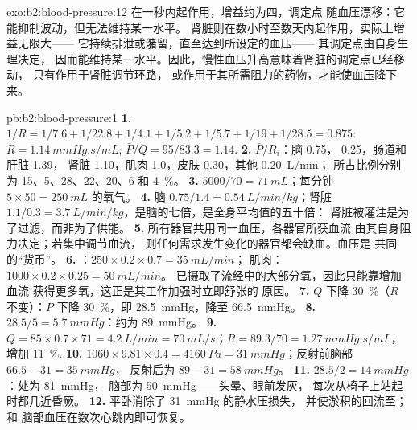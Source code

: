 \begin{solution}{exo:b2:blood-pressure:12}
在一秒内起作用，增益约为四，调定点
随血压漂移：它能抑制波动，但无法维持某一水平。
肾脏则在数小时至数天内起作用，实际上增益无限大——
它持续排泄或潴留，直至达到所设定的血压——
其调定点由自身生理决定，
因而能维持某一水平。因此，慢性血压升高意味着肾脏的调定点已经移动，
只有作用于肾脏调节环路，
或作用于其所需阻力的药物，才能使血压降下来。
\end{solution}

\begin{solution}{pb:b2:blood-pressure:1}
\textbf{1.} $1/R = 1/7.6 + 1/22.8 + 1/4.1 + 1/5.2 + 1/5.7 + 1/19 +
1/28.5 = 0.875$: $R = \qty{1.14}{mmHg.s/mL}$; $\bar P/Q = 95/83.3 =
1.14$.
\textbf{2.} $\bar P/R_i$：脑 0.75， 0.25，肠道和肝脏 1.39，
肾脏 1.10，肌肉 1.0，皮肤 0.30，其他 \qty{0.20}{L/min}；
所占比例分别为 15、5、28、22、20、6 和 \qty{4}{\%}。
\textbf{3.} $5000/70 = \qty{71}{mL}$；每分钟
$5\times 50 = \qty{250}{mL}$ 的氧气。
\textbf{4.} 脑 $0.75/1.4 = \qty{0.54}{L/min/kg}$；肾脏 $1.1/0.3
= \qty{3.7}{L/min/kg}$，是脑的七倍，是全身平均值的五十倍：
肾脏被灌注是为了过滤，而非为了供能。
\textbf{5.} 所有器官共用同一血压，各器官所获血流
由其自身阻力决定；若集中调节血流，
则任何需求发生变化的器官都会缺血。血压是
共同的“货币”。
\textbf{6.} ：$250\times 0.2\times 0.7 = \qty{35}{mL/min}$；
肌肉：$1000\times 0.2\times 0.25 = \qty{50}{mL/min}$。
已摄取了流经中的大部分氧，因此只能靠增加血流
获得更多氧，这正是其工作加强时立即舒张的
原因。
\textbf{7.} $Q$ 下降 \qty{30}{\%}（$R$ 不变）：$\bar P$ 下降
\qty{30}{\%}，即 \qty{28.5}{mmHg}，降至 \qty{66.5}{mmHg}。
\textbf{8.} $28.5/5 = \qty{5.7}{mmHg}$：约为 \qty{89}{mmHg}。
\textbf{9.} $Q = 85\times 0.7\times 71 = \qty{4.2}{L/min} =
\qty{70}{mL/s}$；$R = 89.3/70 = \qty{1.27}{mmHg.s/mL}$，增加
\qty{11}{\%}.
\textbf{10.} $1060\times 9.81\times 0.4 = \qty{4160}{Pa} =
\qty{31}{mmHg}$；反射前脑部 $66.5 - 31 = \qty{35}{mmHg}$，
反射后为 $89 - 31 = \qty{58}{mmHg}$。
\textbf{11.} $28.5/2 = \qty{14}{mmHg}$：处为 \qty{81}{mmHg}，
脑部为 \qty{50}{mmHg}——头晕、眼前发灰，
每次从椅子上站起时都几近昏厥。
\textbf{12.} 平卧消除了 \qty{31}{mmHg} 的静水压损失，
并使淤积的回流至；和
脑部血压在数次心跳内即可恢复。

\end{solution}
